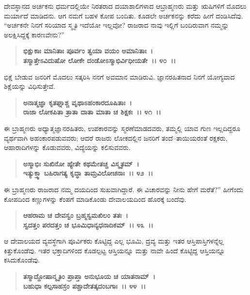 ದೇವಸ್ಥಾನದ ಅರ್ಚಕನು ಧರ್ಮದಲ್ಲಿಯೇ ನಿರತರಾದ ದಯಾಶಾಲಿಗಳಾದ ಆ\break ಬ್ರಾಹ್ಮಣರು ಮತ್ತು ಋಷಿಗಳಿಗೆ ಮೊದಲು ಮರ್ಯಾದೆ ಮಾಡಿದನು. ಆಗ ನಮಗೆ ಬಹಳ ಕೋಪ ಬಂದಿತು. ಕೂಡಲೇ ಅರ್ಚಕನನ್ನು ಕರೆದು ಹೀಗೆ ದಂಡಿಸಿದೆವು. ``ಅರ್ಚಕನೇ ನಿನಗೆ ಸರಿಯಾದ ಸ್ಮೃತಿ ಇದೆಯೋ ಇಲ್ಲವೋ? ರಾಜರಾದ ನಾವು ಇಲ್ಲಿಗೆ ಬಂದಿರುವಾಗ ನಮ್ಮನ್ನು ಅಲಕ್ಷಿಸಿದ್ದಕ್ಕೆ ಕಾರಣವೇನು?”

\begin{verse}
\textbf{ಭಿಕ್ಷುಕಾಃ ಮಾನಿತಾಃ ಪೂರ್ವಂ ತ್ವಯಾ ವಯಂ ಅಮಾನಿತಾಃ~।}\\\textbf{ತಸ್ಮಾತ್ತೇಽವಿದುಷೋ ಲೋಕೇ ದಂಡೋಽಸ್ಮಾಭಿರ್ವಿಧೀಯತೇ~।। ೪೦~।। }
\end{verse}

ಭಿಕ್ಷೆ ಬೇಡುವ ಜನರಿಗೆ ಮೊದಲು ಸತ್ಕರಿಸಿ ನನಗೆ ಅವಮಾನ ಮಾಡಿರುವಿ. ಜ್ಞಾನರಹಿತನಾದ ನಿನಗೆ ಯೋಗ್ಯವಾದ ಶಿಕ್ಷೆಯನ್ನು ವಿಧಿಸುತ್ತೇವೆ.

\begin{verse}
\textbf{ಅನಾತ್ಮಜ್ಞಾ ಕೃತಘ್ನಾಶ್ಚ ವೃಥಾಽಹಂಕಾರದೂಷಿತಾಃ~।}\\\textbf{ರಾಜಾ ಲೋಕಪಿತಾ ತ್ರಾತಾ ದಾತಾ ಮಾತಾ ಚ ಶಿಕ್ಷಕಃ~।। ೪೧~।। }
\end{verse}

ಈ ಬ್ರಾಹ್ಮಣರು ಅಧ್ಯಾತ್ಮಜ್ಞಾನರಹಿತರು, ಉಪಕಾರವನ್ನು ಸ್ಮರಣೆಮಾಡದವರು, ತಮ್ಮಲ್ಲಿ ಯಾವ ಗುಣ ಇಲ್ಲದಿದ್ದರೂ ವ್ಯರ್ಥವಾಗಿ ಅಹಂಕಾರಪಡುವವರು; ಆದರೆ ರಾಜರು ಲೋಕದಲ್ಲಿನ ಜನರಿಗೆ ತಂದೆ–ತಾಯಿಯರಂತೆ ರಕ್ಷಕರು, ಆಹಾರಾದಿಗಳನ್ನು ಕೊಡುವವರು, ವಿದ್ಯೆಯನ್ನು ಕಲಿಸುವವರು.

\begin{verse}
\textbf{ಅಸ್ಮಾಭಿಃ ಸುಖಿನೋ ಹ್ಯೇತೇ ಕಥಮೇತಚ್ಚ ವಿಸ್ಮೃತಮ್~।}\\\textbf{ಇತ್ಯುಕ್ತ್ವಾ ಬಹಿರಾಗತ್ಯ ಕೃದ್ಧಾ ತಾಮ್ರವಿಲೋಚನಾಃ~।। ೪೨~।। }
\end{verse}

ಈ ಬ್ರಾಹ್ಮಣರು ರಾಜರಾದ ನಮ್ಮ ದಯದಿಂದ ಸುಖವಾಗಿದ್ದಾರೆ. ಈ ವಿಚಾರವನ್ನು ನೀನು ಹೇಗೆ ಮರೆತೆ?” ಹೀಗೆಂದು ಕೋಪದಿಂದ ಕಣ್ಣುಗಳನ್ನು ಕೆಂಪಗೆ ಮಾಡಿಕೊಂಡು ದೇವಾಲಯದಿಂದ ಹೊರಕ್ಕೆ ಬಂದೆವು.

\begin{verse}
\textbf{ಆಹರಾಮ ಚ ದೇವಸ್ವಂ ಬ್ರಹ್ಮಸ್ವಮಖಿಲಂ ತತಃ~।}\\\textbf{ಸ್ವದತ್ತಂ ಪರದತ್ತಂ ಚ ಭೂಮಿಧಾನ್ಯಧನಾದಿಕಮ್~।। ೪೩~।।} 
\end{verse}

ಆ ದೇವಾಲಯದ ವ್ಯವಸ್ಥೆಗಾಗಿ ಪೂರ್ವಿಕರು ಕೊಟ್ಟಿದ್ದ ಎಲ್ಲ ಭೂಮಿ, ದ್ರವ್ಯ ಮತ್ತು ಇತರ ಆಸ್ತಿಪಾಸ್ತಿಗಳನ್ನೆಲ್ಲ ಕಿತ್ತುಕೊಂಡೆವು. ಇತರ ಭಕ್ತಾದಿಗಳಿಂದ ಕೊಡಲ್ಪಟ್ಟ ಆಸ್ತಿಯನ್ನೂ ಮತ್ತು ನಾವೇ ಹಿಂದೆ ಕೊಟ್ಟಿದ್ದ ಆಸ್ತಿಯನ್ನೂ ಕಸಿದುಕೊಂಡೆವು.

\begin{verse}
\textbf{ತಸ್ಮಾದ್ದೋಷಾನ್ಮೃತಿಂ ಪ್ರಾಪ್ತಾ ಅನುಭೂಯ ಚ ಯಾತನಾಮ್~।}\\\textbf{ಬಹುಧಾ ಕಲ್ಪಸಾಹಸ್ರಂ ಪಶ್ಚಾದೇತತ್ಕದಂಬಗಾಃ~।। ೪೪~।। }
\end{verse}

